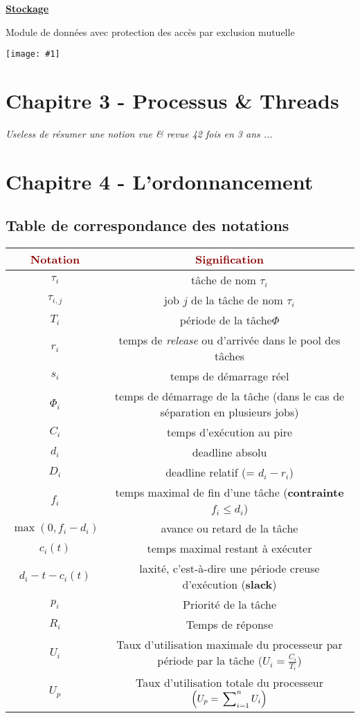 \documentclass{article}
\newcommand{\dred}[1]{\textcolor{darkred}{\textbf{#1}}}
\newcommand{\imgR}[2]{\begin{center}\texttt{[image: \#1]}\end{center}}
\newcommand{\sumin}[3]{\sideset{}{_{i=#1}^{#2}}\sum{#3}}
\newcommand{\stitre}[1]{\noindent\textbf{\underline{#1}} \\}
\begin{document}
\stitre{Stockage}

\begin{multicols}{2}
Module de données avec protection des accès par exclusion mutuelle
\imgR{ITR_022.png}{200}
\end{multicols}

\section{Chapitre 3 - Processus \& Threads}

\textit{Useless de résumer une notion vue \& revue 42 fois en 3 ans ...}

\section{Chapitre 4 - L'ordonnancement}

\subsection{Table de correspondance des notations}

\begin{center}
	\begin{tabular}{|*{2}{c|}}
	\hline
	\dred{Notation} & \dred{Signification} \\
	\hline
	$\tau_i$ & tâche de nom $\tau_i$\\
	\hline
	$\tau_{i,j}$ & job $j$ de la tâche de nom $\tau_i$\\
	\hline
	$T_i$ & période de la tâche$\Phi$\\
	\hline
	$r_i$ & temps de \textit{release} ou d'arrivée dans le pool des tâches\\
	\hline
	$s_i$ & temps de démarrage réel\\
	\hline
	$\Phi_i$ & temps de démarrage de la tâche (dans le cas de séparation en plusieurs jobs)\\
	\hline
	$C_i$ & temps d'exécution au pire\\
	\hline
	$d_i$ & deadline absolu\\
	\hline
	$D_i$ & deadline relatif (= $d_i-r_i$)\\
	\hline
	$f_i$ & temps maximal de fin d'une tâche (\textbf{contrainte} $f_i\leq d_i$)\\
	\hline
	$\max{(0,f_i-d_i)}$ & avance ou retard de la tâche \\
	\hline
	$c_i(t)$ & temps maximal restant à exécuter \\
	\hline
	$d_i-t-c_i(t)$ & laxité, c'est-à-dire une période creuse d'exécution (\textbf{slack}) \\
	\hline
	$p_i$ & Priorité de la tâche \\
	\hline
	$R_i$ & Temps de réponse \\
	\hline
	$U_i$ & Taux d'utilisation maximale du processeur par période par la tâche ($U_i = \frac{C_i}{T_i}$) \\
	\hline
	$U_p$ & Taux d'utilisation totale du processeur $\left(U_p = \sumin{1}{n}{U_i}\right)$ \\
	\hline
	\end{tabular}
\end{center}
\end{document}
